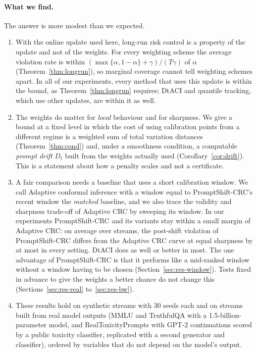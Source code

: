 \paragraph{What we find.}
The answer is more modest than we expected.
\begin{enumerate}[label=(\roman*)]
  \item With the online update used here, long-run risk control is a property of the update and not of the weights. For every weighting scheme the average violation rate is within $(\max\{\alpha,1-\alpha\}+\gamma)/(T\gamma)$ of $\alpha$ (Theorem~\ref{thm:longrun}), so marginal coverage cannot tell weighting schemes apart. In all of our experiments, every method that uses this update is within the bound, as Theorem~\ref{thm:longrun} requires; DtACI and quantile tracking, which use other updates, are within it as well.
  \item The weights do matter for \emph{local} behaviour and for sharpness. We give a bound at a fixed level in which the cost of using calibration points from a different regime is a weighted sum of total variation distances (Theorem~\ref{thm:cond}) and, under a smoothness condition, a computable \emph{prompt drift} $D_t$ built from the weights actually used (Corollary~\ref{cor:drift}). This is a statement about how a penalty scales and not a certificate.
  \item A fair comparison needs a baseline that uses a short calibration window. We call Adaptive conformal inference with a window equal to PromptShift-CRC's recent window the \emph{matched} baseline, and we also trace the validity and sharpness trade-off of Adaptive CRC by sweeping its window. In our experiments PromptShift-CRC and its variants stay within a small margin of Adaptive CRC: on average over streams, the post-shift violation of PromptShift-CRC differs from the Adaptive CRC curve at equal sharpness by at most \PSfrontierMaxAbs{} in every setting. DtACI does as well or better in most. The one advantage of PromptShift-CRC is that it performs like a mid-ranked window without a window having to be chosen (Section~\ref{sec:res-window}). Tests fixed in advance to give the weights a better chance do not change this (Sections~\ref{sec:res-real} to~\ref{sec:res-bw}).
  \item These results hold on synthetic streams with 30 seeds each and on streams built from real model outputs (MMLU and TruthfulQA with a 1.5-billion-parameter model, and RealToxicityPrompts with GPT-2 continuations scored by a public toxicity classifier, replicated with a second generator and classifier), ordered by variables that do not depend on the model's output.
\end{enumerate}

